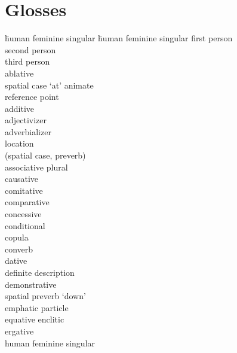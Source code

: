 
\section*{Glosses}
	\begin{multicols}{2}
    \largerpage[2]
		\begin{tabbing}
            \hspace{\tabcolsep}\= human feminine singular\kill
{}\hspace{\tabcolsep}\= human feminine singular\kill
				\>	first person\\
				\>	second person\\
				\>	third person\\
				\>	ablative\\
			 \>	spatial case `at' animate \\
			{}		\> reference point\\
				\>	additive\\
				\>	adjectivizer\\
				\>	adverbializer\\
				\>	location \\
			{}		\>	(spatial case, preverb)\\
				\>	associative plural\\
				\>	causative\\
				\>	comitative\\
				\>	comparative\\
				\>	concessive\\
				\>	conditional\\
				\>	copula\\
				\>	converb\\
				\>	dative\\
				\>	definite description\\
				\>	demonstrative\\
				\>	spatial preverb `down'\\
				\>	emphatic particle\\
				\>	equative enclitic\\
				\>	ergative\\
				\>	human feminine singular\\

\end{tabbing}
\end{multicols}
